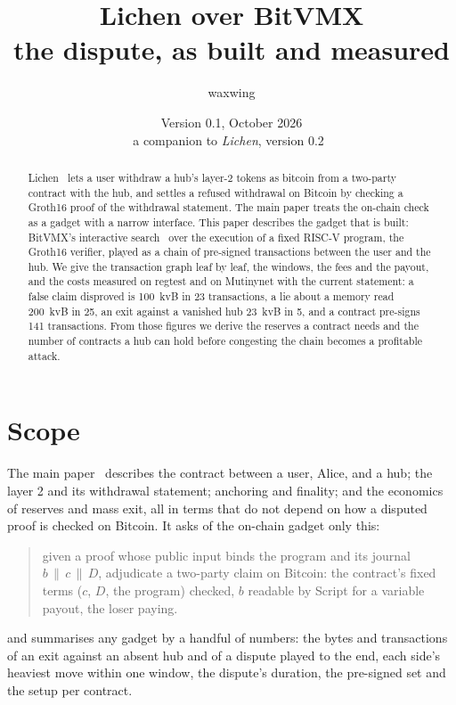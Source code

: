 \documentclass[11pt]{article}
\title{\textbf{Lichen over BitVMX}\\the dispute, as built and measured}
\author{waxwing}
\date{Version 0.1, October 2026\\[2pt]\small a companion to \emph{Lichen}, version 0.2~\cite{lichen}}
\begin{document}
\maketitle

\begin{abstract}
Lichen~\cite{lichen} lets a user withdraw a hub's layer-2 tokens as
bitcoin from a two-party contract with the hub, and settles a refused
withdrawal on Bitcoin by checking a Groth16 proof of the withdrawal
statement. The main paper treats the on-chain check as a gadget with a
narrow interface. This paper describes the gadget that is built: BitVMX's
interactive search~\cite{bitvmx} over the execution of a fixed RISC-V
program, the Groth16 verifier, played as a chain of pre-signed
transactions between the user and the hub. We give the transaction graph
leaf by leaf, the windows, the fees and the payout, and the costs
measured on regtest and on Mutinynet with the current statement: a false
claim disproved is 100~kvB in 23 transactions, a lie about a memory read
200~kvB in 25, an exit against a vanished hub 23~kvB in 5, and a
contract pre-signs 141 transactions. From those figures we derive the
reserves a contract needs and the number of contracts a hub can hold
before congesting the chain becomes a profitable attack.
\end{abstract}

\tableofcontents

\section{Scope}
\label{sec:scope}

The main paper~\cite{lichen} describes the contract between a user,
Alice, and a hub; the layer 2 and its withdrawal statement; anchoring and
finality; and the economics of reserves and mass exit, all in terms that
do not depend on how a disputed proof is checked on Bitcoin. It asks of
the on-chain gadget only this:
\begin{quote}
given a proof whose public input binds the program and its journal
$b \,\|\, c \,\|\, D$, adjudicate a two-party claim on Bitcoin: the
contract's fixed terms ($c$, $D$, the program) checked, $b$ readable by
Script for a variable payout, the loser paying.
\end{quote}
and summarises any gadget by a handful of numbers: the bytes and
transactions of an exit against an absent hub and of a dispute played
to the end, each side's heaviest move within one window, the dispute's
duration, the pre-signed set and the setup per contract.
\end{document}
